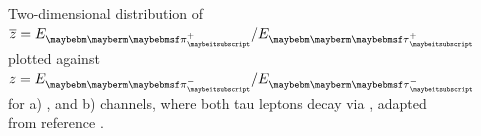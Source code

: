 \begin{figure}[htbp]
\begin{subfigure}[t]{0.45\textwidth}
    \caption{\HiggsToTauTau}
    \label{fig:theoryTauPairCorrelationH}
  \end{subfigure}
\caption[Two-dimensional distribution of \ZToTauTau and \HiggsToTauTau.]
{Two-dimensional distribution of $\overline{z} ={E_{\Ppiplus}}/{E_{\APtauon}}$ plotted against $ z ={E_{\Ppiminus}}/{E_{\Ptauon}}$  for a) \ZToTauTau, and b) \HiggsToTauTau channels, where both tau leptons decay via \tauToPion, adapted from reference \cite{Tsai:1971vv}.}
\label{fig:theoryTauPairCorrelation}
\end{figure} 